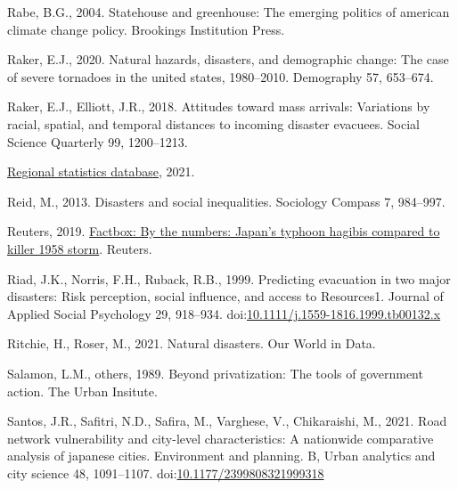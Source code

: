 \documentclass[]{elsarticle} %
\newlength{\cslhangindent}
\newlength{\cslentryspacingunit} %
\newenvironment{CSLReferences}[2] %
 {%
  \setlength{\parindent}{0pt}
  \ifodd #1
  \let\oldpar\par
  \def\par{\hangindent=\cslhangindent\oldpar}
  \fi
  \setlength{\parskip}{#2\cslentryspacingunit}
 }%
 {}
\begin{document}
\begin{CSLReferences}{1}{0}
\leavevmode{}%
Rabe, B.G., 2004. Statehouse and greenhouse: The emerging politics of
american climate change policy. Brookings Institution Press.

\leavevmode{}%
Raker, E.J., 2020. Natural hazards, disasters, and demographic change:
The case of severe tornadoes in the united states, 1980--2010.
Demography 57, 653--674.

\leavevmode{}%
Raker, E.J., Elliott, J.R., 2018. Attitudes toward mass arrivals:
Variations by racial, spatial, and temporal distances to incoming
disaster evacuees. Social Science Quarterly 99, 1200--1213.

\leavevmode{}%
\href{https://www.e-stat.go.jp/en/regional-statistics/ssdsview}{Regional
statistics database}, 2021.

\leavevmode{}%
Reid, M., 2013. Disasters and social inequalities. Sociology Compass 7,
984--997.

\leavevmode{}%
Reuters, 2019.
\href{https://www.reuters.com/article/us-asia-storm-japan-factbox/factbox-by-the-numbers-japans-typhoon-hagibis-compared-to-killer-1958-storm-idUSKBN1WT0DR}{Factbox:
By the numbers: Japan's typhoon hagibis compared to killer 1958 storm}.
Reuters.

\leavevmode{}%
Riad, J.K., Norris, F.H., Ruback, R.B., 1999. Predicting evacuation in
two major disasters: Risk perception, social influence, and access to
Resources1. Journal of Applied Social Psychology 29, 918--934.
doi:\href{https://doi.org/10.1111/j.1559-1816.1999.tb00132.x}{10.1111/j.1559-1816.1999.tb00132.x}

\leavevmode{}%
Ritchie, H., Roser, M., 2021. Natural disasters. Our World in Data.

\leavevmode{}%
Salamon, L.M., others, 1989. Beyond privatization: The tools of
government action. The Urban Insitute.

\leavevmode{}%
Santos, J.R., Safitri, N.D., Safira, M., Varghese, V., Chikaraishi, M.,
2021. Road network vulnerability and city-level characteristics: A
nationwide comparative analysis of japanese cities. Environment and
planning. B, Urban analytics and city science 48, 1091--1107.
doi:\href{https://doi.org/10.1177/2399808321999318}{10.1177/2399808321999318}


\end{CSLReferences}
\end{document}
